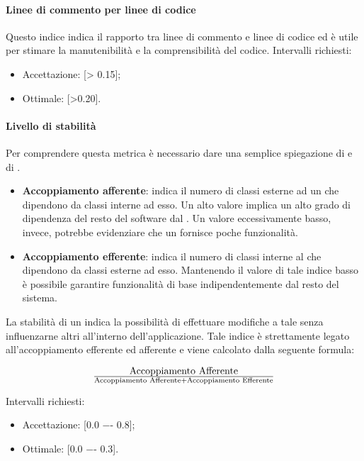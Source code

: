 \paragraph{Linee di commento per linee di codice}
Questo indice indica il rapporto tra linee di commento e linee di codice ed è utile per stimare la manutenibilità e la comprensibilità del codice. 
Intervalli richiesti:
\begin{itemize}
\item
Accettazione: [> 0.15];
\item
Ottimale: [>0.20].
\end{itemize}

\paragraph{Livello di stabilità}
Per comprendere questa metrica è necessario dare una semplice spiegazione di  e di .
\begin{itemize}
\item
\textbf{Accoppiamento afferente}: indica il numero di classi esterne ad un  che dipendono da classi interne ad esso.
Un alto valore implica un alto grado di dipendenza del resto del software dal . Un valore eccessivamente basso, invece, potrebbe evidenziare che un  fornisce poche funzionalità.
\item
\textbf{Accoppiamento efferente}: indica il numero di classi interne al  che dipendono da classi esterne ad esso.
Mantenendo il valore di tale indice basso è possibile garantire funzionalità di base indipendentemente dal resto del sistema.
\end{itemize}

La stabilità di un  indica la possibilità di effettuare modifiche a tale  senza influenzarne altri all'interno dell'applicazione. Tale indice è strettamente legato all'accoppiamento efferente ed afferente e viene calcolato dalla seguente formula:

\begin{displaymath}
{\text{Accoppiamento Afferente}}\over{\text{Accoppiamento Afferente} + \text{Accoppiamento Efferente}}
\end{displaymath}

Intervalli richiesti:
\begin{itemize}
\item
Accettazione: [0.0 −- 0.8];
\item
Ottimale: [0.0 −- 0.3].
\end{itemize}

\newpage